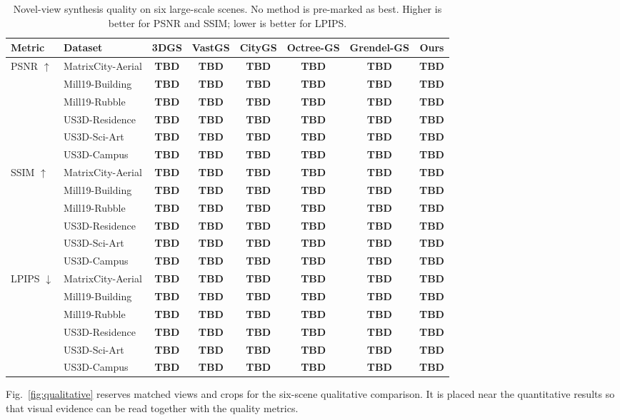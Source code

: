 \documentclass[conference]{IEEEtran}
\newcommand{\TBD}{\textbf{TBD}}
\begin{document}
\begin{table}[t]
\caption{Novel-view synthesis quality on six large-scale scenes. No method is pre-marked as best. Higher is better for PSNR and SSIM; lower is better for LPIPS.}
\label{tab:quality}
\centering
\setlength{\tabcolsep}{3.2pt}
\begin{tabular}{llcccccc}
\toprule
Metric & Dataset & 3DGS & VastGS & CityGS & Octree-GS & Grendel-GS & Ours \\
\midrule
\multirow{6}{*}{PSNR $\uparrow$}
& MatrixCity-Aerial & \TBD & \TBD & \TBD & \TBD & \TBD & \TBD \\
& Mill19-Building & \TBD & \TBD & \TBD & \TBD & \TBD & \TBD \\
& Mill19-Rubble & \TBD & \TBD & \TBD & \TBD & \TBD & \TBD \\
& US3D-Residence & \TBD & \TBD & \TBD & \TBD & \TBD & \TBD \\
& US3D-Sci-Art & \TBD & \TBD & \TBD & \TBD & \TBD & \TBD \\
& US3D-Campus & \TBD & \TBD & \TBD & \TBD & \TBD & \TBD \\
\midrule
\multirow{6}{*}{SSIM $\uparrow$}
& MatrixCity-Aerial & \TBD & \TBD & \TBD & \TBD & \TBD & \TBD \\
& Mill19-Building & \TBD & \TBD & \TBD & \TBD & \TBD & \TBD \\
& Mill19-Rubble & \TBD & \TBD & \TBD & \TBD & \TBD & \TBD \\
& US3D-Residence & \TBD & \TBD & \TBD & \TBD & \TBD & \TBD \\
& US3D-Sci-Art & \TBD & \TBD & \TBD & \TBD & \TBD & \TBD \\
& US3D-Campus & \TBD & \TBD & \TBD & \TBD & \TBD & \TBD \\
\midrule
\multirow{6}{*}{LPIPS $\downarrow$}
& MatrixCity-Aerial & \TBD & \TBD & \TBD & \TBD & \TBD & \TBD \\
& Mill19-Building & \TBD & \TBD & \TBD & \TBD & \TBD & \TBD \\
& Mill19-Rubble & \TBD & \TBD & \TBD & \TBD & \TBD & \TBD \\
& US3D-Residence & \TBD & \TBD & \TBD & \TBD & \TBD & \TBD \\
& US3D-Sci-Art & \TBD & \TBD & \TBD & \TBD & \TBD & \TBD \\
& US3D-Campus & \TBD & \TBD & \TBD & \TBD & \TBD & \TBD \\
\bottomrule
\end{tabular}
\end{table}

Fig.~\ref{fig:qualitative} reserves matched views and crops for the six-scene qualitative comparison. It is placed near the quantitative results so that visual evidence can be read together with the quality metrics.
\end{document}
